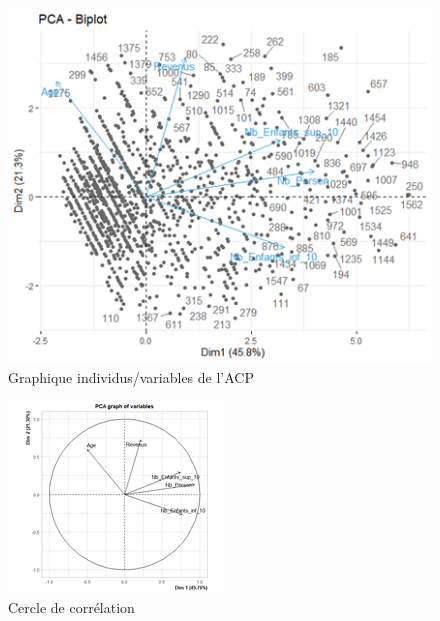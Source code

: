 \documentclass[11pt,a4paper, x11names]{article}\usepackage[]{graphicx}\usepackage[]{color}
\begin{document}
\begin{mdframed}
\begin{minipage}{0.45\textwidth}
\begin{figure}[H]
\includegraphics[]{graphiques/ACP1.png}
\caption{Graphique individus/variables de l'ACP} \label{fig3:ACP1}
\end{figure}
\end{minipage}
\hfill
\begin{minipage}{0.45\textwidth}
\begin{figure}[H]
\includegraphics[]{graphiques/ACP2.png}
\caption{Cercle de corrélation} \label{fig4:ACP2}
\end{figure}
\end{minipage}
\end{mdframed}
\end{document}
